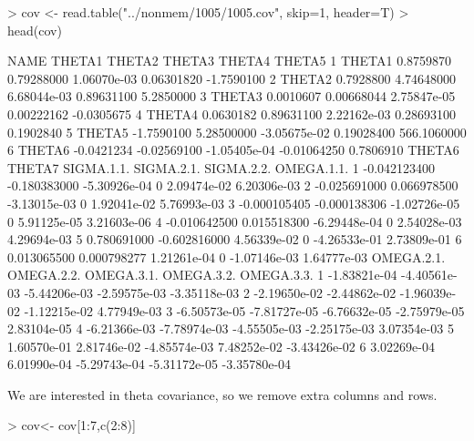 \begin{Schunk}
\begin{Sinput}
> cov <- read.table("../nonmem/1005/1005.cov", skip=1, header=T)
> head(cov)
\end{Sinput}
\begin{Soutput}
    NAME     THETA1      THETA2       THETA3      THETA4      THETA5
1 THETA1  0.8759870  0.79288000  1.06070e-03  0.06301820  -1.7590100
2 THETA2  0.7928800  4.74648000  6.68044e-03  0.89631100   5.2850000
3 THETA3  0.0010607  0.00668044  2.75847e-05  0.00222162  -0.0305675
4 THETA4  0.0630182  0.89631100  2.22162e-03  0.28693100   0.1902840
5 THETA5 -1.7590100  5.28500000 -3.05675e-02  0.19028400 566.1060000
6 THETA6 -0.0421234 -0.02569100 -1.05405e-04 -0.01064250   0.7806910
        THETA6       THETA7   SIGMA.1.1. SIGMA.2.1.   SIGMA.2.2.  OMEGA.1.1.
1 -0.042123400 -0.180383000 -5.30926e-04          0  2.09474e-02 6.20306e-03
2 -0.025691000  0.066978500 -3.13015e-03          0  1.92041e-02 5.76993e-03
3 -0.000105405 -0.000138306 -1.02726e-05          0  5.91125e-05 3.21603e-06
4 -0.010642500  0.015518300 -6.29448e-04          0  2.54028e-03 4.29694e-03
5  0.780691000 -0.602816000  4.56339e-02          0 -4.26533e-01 2.73809e-01
6  0.013065500  0.000798277  1.21261e-04          0 -1.07146e-03 1.64777e-03
    OMEGA.2.1.   OMEGA.2.2.   OMEGA.3.1.   OMEGA.3.2.   OMEGA.3.3.
1 -1.83821e-04 -4.40561e-03 -5.44206e-03 -2.59575e-03 -3.35118e-03
2 -2.19650e-02 -2.44862e-02 -1.96039e-02 -1.12215e-02  4.77949e-03
3 -6.50573e-05 -7.81727e-05 -6.76632e-05 -2.75979e-05  2.83104e-05
4 -6.21366e-03 -7.78974e-03 -4.55505e-03 -2.25175e-03  3.07354e-03
5  1.60570e-01  2.81746e-02 -4.85574e-03  7.48252e-02 -3.43426e-02
6  3.02269e-04  6.01990e-04 -5.29743e-04 -5.31172e-05 -3.35780e-04
\end{Soutput}
\end{Schunk}
We are interested in theta covariance, so we remove extra columns and rows.
\begin{Schunk}
\begin{Sinput}
> cov<- cov[1:7,c(2:8)]
\end{Sinput}
\end{Schunk}
